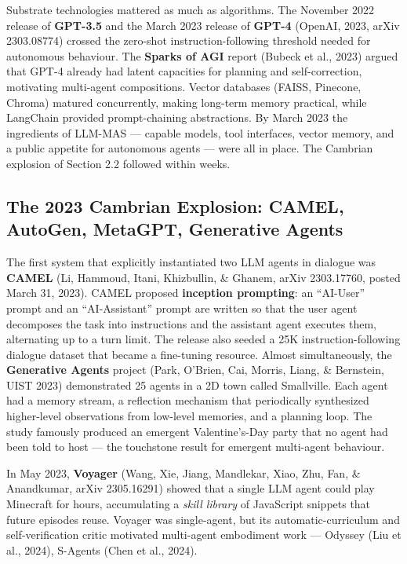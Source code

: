 Substrate technologies mattered as much as algorithms. The November 2022 release of \textbf{GPT-3.5} and the March 2023 release of \textbf{GPT-4} (OpenAI, 2023, arXiv 2303.08774) crossed the zero-shot instruction-following threshold needed for autonomous behaviour. The \textbf{Sparks of AGI} report (Bubeck et al., 2023) argued that GPT-4 already had latent capacities for planning and self-correction, motivating multi-agent compositions. Vector databases (FAISS, Pinecone, Chroma) matured concurrently, making long-term memory practical, while LangChain provided prompt-chaining abstractions. By March 2023 the ingredients of LLM-MAS --- capable models, tool interfaces, vector memory, and a public appetite for autonomous agents --- were all in place. The Cambrian explosion of Section 2.2 followed within weeks.

\subsection{The 2023 Cambrian Explosion: CAMEL, AutoGen, MetaGPT, Generative Agents}\label{the-2023-cambrian-explosion-camel-autogen-metagpt-generative-agents}

The first system that explicitly instantiated two LLM agents in dialogue was \textbf{CAMEL} (Li, Hammoud, Itani, Khizbullin, \& Ghanem, arXiv 2303.17760, posted March 31, 2023). CAMEL proposed \textbf{inception prompting}: an ``AI-User'' prompt and an ``AI-Assistant'' prompt are written so that the user agent decomposes the task into instructions and the assistant agent executes them, alternating up to a turn limit. The release also seeded a 25K instruction-following dialogue dataset that became a fine-tuning resource. Almost simultaneously, the \textbf{Generative Agents} project (Park, O'Brien, Cai, Morris, Liang, \& Bernstein, UIST 2023) demonstrated 25 agents in a 2D town called Smallville. Each agent had a memory stream, a reflection mechanism that periodically synthesized higher-level observations from low-level memories, and a planning loop. The study famously produced an emergent Valentine's-Day party that no agent had been told to host --- the touchstone result for emergent multi-agent behaviour.

In May 2023, \textbf{Voyager} (Wang, Xie, Jiang, Mandlekar, Xiao, Zhu, Fan, \& Anandkumar, arXiv 2305.16291) showed that a single LLM agent could play Minecraft for hours, accumulating a \emph{skill library} of JavaScript snippets that future episodes reuse. Voyager was single-agent, but its automatic-curriculum and self-verification critic motivated multi-agent embodiment work --- Odyssey (Liu et al., 2024), S-Agents (Chen et al., 2024).

